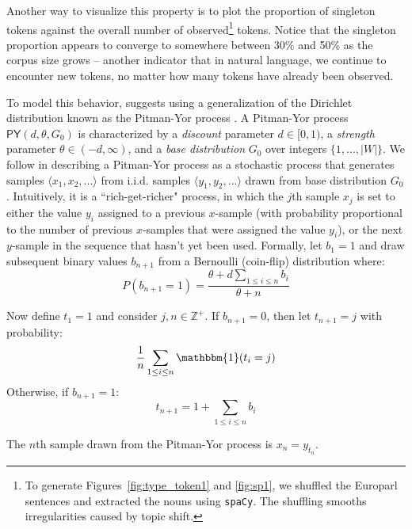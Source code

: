 \documentclass[11pt,a4paper]{article}
\begin{document}
Another way to visualize this property \cite{teh-2006-hierarchical} is to plot the proportion of singleton tokens against the overall number of observed\footnote{To generate Figures~\ref{fig:type_token1} and \ref{fig:sp1}, we shuffled the Europarl sentences and extracted the nouns using \texttt{spaCy}. The shuffling smooths irregularities caused by topic shift.} tokens. Notice that the singleton proportion appears to converge to somewhere between 30\% and 50\% as the corpus size grows -- another indicator that in natural language, we continue to encounter new tokens, no matter how many tokens have already been observed.

To model this behavior, \cite{teh-2006-hierarchical} suggests using a generalization of the Dirichlet distribution \cite{kotz2004continuous} known as the Pitman-Yor process \cite{pitman1997two}. A Pitman-Yor process $\mathsf{PY}(d, \theta, G_0)$ is characterized by a \emph{discount} parameter $d \in [0,1)$, a \emph{strength} parameter $\theta \in (-d,\infty)$, and a \emph{base distribution} $G_0$ over integers $\{1, ..., |W|\}$. We follow \cite{teh-2006-hierarchical} in describing a Pitman-Yor process as a stochastic process that generates samples $\langle x_1, x_2, ... \rangle$ from i.i.d. samples $\langle y_1, y_2, ... \rangle$ drawn from base distribution $G_0$. Intuitively, it is a ``rich-get-richer" process, in which the $j$th sample $x_j$ is set to either the value $y_i$ assigned to a previous $x$-sample (with probability proportional to the number of previous $x$-samples that were assigned the value $y_i$), or the next $y$-sample in the sequence that hasn't yet been used. Formally, let $b_1=1$ and draw subsequent binary values $b_{n+1}$ from a Bernoulli (coin-flip) distribution where:
\begin{equation*}
	P(b_{n+1} = 1) =\frac{\theta + d\sum\limits_{1 \leq i \leq n} b_i}{\theta + n} 
\end{equation*}

\noindent Now define $t_1 = 1$ and consider $j, n \in \mathbb{Z}^+$. If $b_{n+1}=0$, then let $t_{n+1}=j$ with probability:
\begin{equation*}
	\frac{1}{n} \sum\limits_{1 \leq i \leq n} \mathbbm{1}(t_i=j)
\end{equation*}
Otherwise, if $b_{n+1}=1$: 
\begin{equation*}
t_{n+1}=1 + \sum\limits_{1 \leq i \leq n} b_i
\end{equation*}

\noindent The $n$th sample drawn from the Pitman-Yor process is $x_n = y_{t_n}$.
\end{document}
